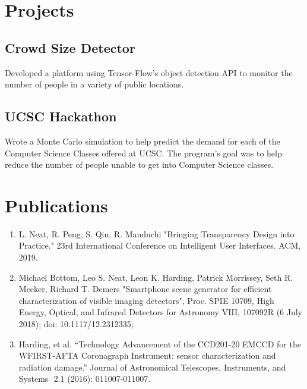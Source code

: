 \documentclass[letterpaper]{deedy-resume} %
\begin{document}
\begin{minipage}[t]{0.33\textwidth} %
\section{Projects}
\subsection{Crowd Size Detector}
	Developed a platform using Tensor-Flow's object detection API to monitor the number of people in a variety of public locations.
\sectionspace

\subsection{UCSC Hackathon}
	Wrote a Monte Carlo simulation to help predict the demand for each of the Computer Science Classes offered at UCSC. The program's goal was to help reduce the number of people unable to get into Computer Science classes.

\end{minipage} %
\hfill
\begin{minipage}[t]{0.66\textwidth} %



\section{Publications} 

\begin{enumerate}
	\item
	L. Neat, R. Peng, S. Qin, R. Manduchi "Bringing Transparency Design into Practice." 23rd International Conference on Intelligent User Interfaces. ACM, 2019.
	
	\item
	Michael Bottom, Leo S. Neat, Leon K. Harding, Patrick Morrissey, Seth R. Meeker, Richard T. Demers  "Smartphone scene generator for efficient characterization of visible imaging detectors", Proc. SPIE 10709, High Energy, Optical, and Infrared Detectors for Astronomy VIII, 107092R (6 July 2018); doi: 10.1117/12.2312335;
	
	\item
	Harding, et al.  ``Technology Advancement of the CCD201-20 EMCCD for the WFIRST-AFTA Coronagraph Instrument: sensor characterization and radiation damage.'' Journal of Astronomical Telescopes, Instruments,  and Systems 
	​ 2.1 (2016): 011007-011007. 
\end{enumerate}

\end{minipage} %

\end{document}
